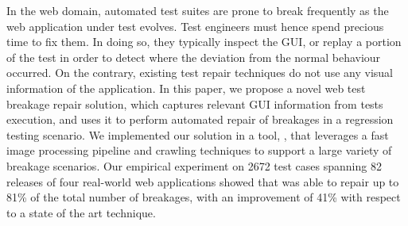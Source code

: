 In the web domain, automated test suites are prone to break frequently as the web application under test evolves. Test engineers must hence spend precious time to fix them. In doing so, they typically inspect the GUI, or replay a portion of the test in order to detect where the deviation from the normal behaviour occurred. 
On the contrary, existing test repair techniques do not use any visual information of the application.
In this paper, we propose a novel web test breakage repair solution, which captures relevant GUI information from tests execution, and uses it to perform automated repair of breakages in a regression testing scenario. We implemented our solution in a tool, \tool, that leverages a fast image processing pipeline and crawling techniques to support a large variety of breakage scenarios. Our empirical experiment on 2672 test cases spanning 82 releases of four real-world web applications showed that \tool was able to repair up to 81\% of the total number of breakages, with an improvement of 41\% with respect to a state of the art technique. %